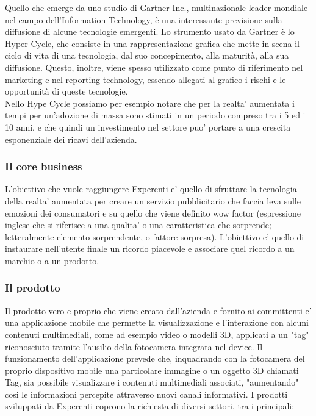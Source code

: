 Quello che emerge da uno studio di Gartner Inc., multinazionale leader mondiale nel campo dell’Information Technology, è una interessante previsione sulla diffusione di alcune tecnologie emergenti. Lo strumento usato da Gartner è lo Hyper Cycle, che consiste in una rappresentazione grafica che mette in scena il ciclo di vita di una tecnologia, dal suo concepimento, alla maturità, alla sua diffusione. Questo, inoltre, viene spesso utilizzato come punto di riferimento nel marketing e nel reporting technology, essendo allegati al grafico i rischi e le opportunità di queste tecnologie.
\\
Nello Hype Cycle possiamo per esempio notare che per la realta' aumentata i tempi per un’adozione di massa sono stimati in un periodo compreso tra i 5 ed i 10 anni, e che quindi un investimento nel settore puo' portare a una crescita esponenziale dei ricavi dell'azienda. 

\subsubsection{Il core business}
L'obiettivo che vuole raggiungere Experenti e' quello di sfruttare la tecnologia della realta' aumentata per creare un servizio pubblicitario che faccia leva sulle emozioni dei consumatori e su quello che viene definito wow factor (espressione inglese che si riferisce a una qualita' o una caratteristica che sorprende; letteralmente elemento sorprendente, o fattore sorpresa). L'obiettivo e' quello di instaurare nell'utente finale un ricordo piacevole e associare quel ricordo a un marchio o a un prodotto.

\subsubsection{Il prodotto}
Il prodotto vero e proprio che viene creato dall'azienda e fornito ai committenti e' una applicazione mobile che permette la visualizzazione e l'interazione con alcuni contenuti multimediali, come ad esempio video o modelli 3D, applicati a un "tag" riconosciuto tramite l'ausilio della fotocamera integrata nel device.
Il funzionamento dell'applicazione prevede che, inquadrando con la fotocamera del proprio dispositivo mobile una particolare immagine o un oggetto 3D chiamati Tag, sia possibile visualizzare i contenuti multimediali associati, "aumentando" cosi le informazioni percepite attraverso nuovi canali informativi.
I prodotti sviluppati da Experenti coprono la richiesta di diversi settori, tra i principali:

